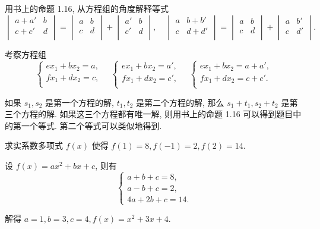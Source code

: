 \documentclass{ctexart}
\begin{document}
\begin{exercisec}[1.18(3)]
    用书上的命题 1.16, 从方程组的角度解释等式
    \[\begin{vmatrix}
        a+a' & b \\
        c+c' & d \\
    \end{vmatrix}=\begin{vmatrix}
        a & b \\
        c & d \\
    \end{vmatrix}+\begin{vmatrix}
        a' & b \\
        c' & d \\
    \end{vmatrix},\quad\begin{vmatrix}
        a & b+b' \\
        c & d+d' \\
    \end{vmatrix}=\begin{vmatrix}
        a & b \\
        c & d \\
    \end{vmatrix}+\begin{vmatrix}
        a & b' \\
        c & d' \\
    \end{vmatrix}.\]
\end{exercisec}
\begin{solution}
    考察方程组
    \[\begin{cases}
        ex_1+bx_2=a, \\
        fx_1+dx_2=c, \\
    \end{cases}\quad\begin{cases}
        ex_1+bx_2=a', \\
        fx_1+dx_2=c', \\
    \end{cases}\quad\begin{cases}
        ex_1+bx_2=a+a', \\
        fx_1+dx_2=c+c'. \\
    \end{cases}\]

    如果 $s_1,s_2$ 是第一个方程的解, $t_1,t_2$ 是第二个方程的解, 那么 $s_1+t_1,s_2+t_2$ 是第三个方程的解. 如果这三个方程都有唯一解, 则用书上的命题 1.16 可以得到题目中的第一个等式. 第二个等式可以类似地得到.
\end{solution}
\begin{exercisec}[1.5.1]
    求实系数多项式 $f(x)$ 使得 $f(1)=8,f(-1)=2,f(2)=14$.
\end{exercisec}
\begin{solution}
    设 $f(x)=ax^2+bx+c$, 则有
    \[\begin{cases}
        a+b+c=8, \\
        a-b+c=2, \\
        4a+2b+c=14.
    \end{cases}\]

    解得 $a=1,b=3,c=4,f(x)=x^2+3x+4$.
\end{solution}
\end{document}
